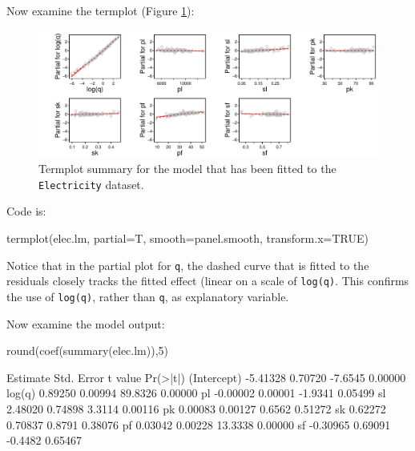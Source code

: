 \documentclass{tufte-book}\usepackage[]{graphicx}\usepackage[]{color}
\newcommand{\txtt}[1]{\texttt{#1}}
\begin{document}
Now examine the termplot (Figure \ref{fig:elec-log-tplot}):
\begin{figure}[h]
\begin{Schunk}


\centerline{\includegraphics[width=\textwidth]{figs/8-elec-me-tplot-1} }

\end{Schunk}
\caption{Termplot summary for the model that has been fitted to the
  \texttt{Electricity} dataset.\label{fig:elec-log-tplot}}
\end{figure}
\noindent Code is:
\begin{Schunk}
\begin{Sinput}
termplot(elec.lm, partial=T, smooth=panel.smooth,
         transform.x=TRUE)
\end{Sinput}
\end{Schunk}
Notice that in the partial plot for \txtt{q}, the dashed curve that is
fitted to the residuals closely tracks the fitted effect (linear on a
scale of \txtt{log(q)}.  This confirms the use of \txtt{log(q)},
rather than \txtt{q}, as explanatory variable.

Now examine the model output:
\begin{Schunk}
\begin{Sinput}
round(coef(summary(elec.lm)),5)
\end{Sinput}
\begin{Soutput}
            Estimate Std. Error t value Pr(>|t|)
(Intercept) -5.41328    0.70720 -7.6545  0.00000
log(q)       0.89250    0.00994 89.8326  0.00000
pl          -0.00002    0.00001 -1.9341  0.05499
sl           2.48020    0.74898  3.3114  0.00116
pk           0.00083    0.00127  0.6562  0.51272
sk           0.62272    0.70837  0.8791  0.38076
pf           0.03042    0.00228 13.3338  0.00000
sf          -0.30965    0.69091 -0.4482  0.65467
\end{Soutput}
\end{Schunk}
\end{document}
